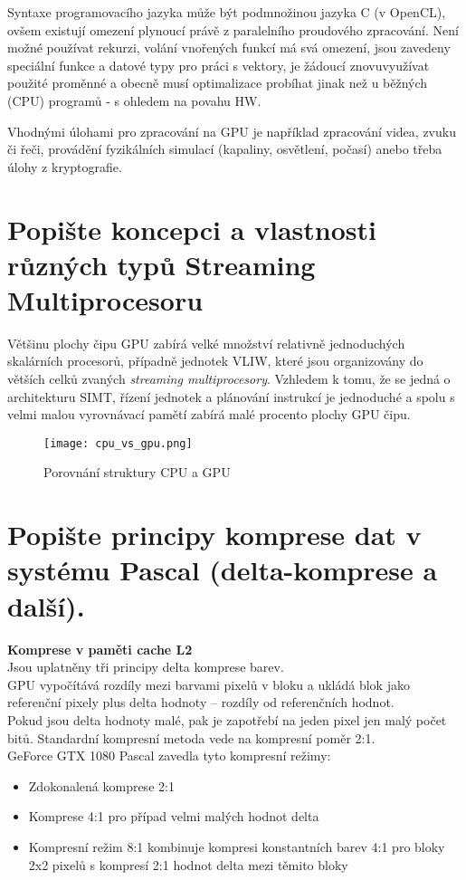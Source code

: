 	Syntaxe programovacího jazyka může být podmnožinou jazyka C (v OpenCL), ovšem existují omezení plynoucí právě z paralelního proudového zpracování. Není možné používat rekurzi, volání vnořených funkcí má svá omezení, jsou zavedeny speciální funkce a datové typy pro práci s vektory, je žádoucí znovuvyužívat použité proměnné a obecně musí optimalizace probíhat jinak než u běžných (CPU) programů - s ohledem na povahu HW.
	
	Vhodnými úlohami pro zpracování na GPU je například zpracování videa, zvuku či řeči, provádění fyzikálních simulací (kapaliny, osvětlení, počasí) anebo třeba úlohy z kryptografie.


\section{Popište koncepci a vlastnosti různých typů Streaming Multiprocesoru}
	\label{sec:streaming_multiprocesor}
	Většinu plochy čipu GPU zabírá velké množství relativně jednoduchých skalárních procesorů, případně jednotek VLIW, které jsou organizovány do větších celků zvaných \emph{streaming multiprocesory}.
	Vzhledem k tomu, že se jedná o architekturu SIMT, řízení jednotek a plánování instrukcí je jednoduché a spolu s velmi malou vyrovnávací pamětí zabírá malé procento plochy GPU čipu.
	\begin{figure}[h!]
		\centering
		\texttt{[image: cpu\_vs\_gpu.png]}
		\caption{Porovnání struktury CPU a GPU}
		\label{fig:cpu_vs_gpu}
	\end{figure}
	
	
\section{Popište principy komprese dat v systému Pascal (delta-komprese a další).}
	\label{sec:komprese}
	\textbf{Komprese v paměti cache L2} \\
	Jsou uplatněny tři principy delta komprese barev. \\
	GPU vypočítává rozdíly mezi barvami pixelů v bloku a ukládá blok jako referenční pixely plus delta hodnoty -- rozdíly od referenčních hodnot. \\
	Pokud jsou delta hodnoty malé, pak je zapotřebí na jeden pixel jen malý	počet bitů. Standardní kompresní metoda vede na kompresní poměr 2:1. \\
	GeForce GTX 1080 Pascal zavedla tyto kompresní režimy:
	\begin{itemize}
		\setlength\itemsep{0em}
		\item Zdokonalená komprese 2:1
		\item Komprese 4:1 pro případ velmi malých hodnot delta
		\item Kompresní režim 8:1 kombinuje kompresi konstantních barev 4:1 pro bloky 2x2 pixelů s kompresí 2:1 hodnot delta mezi těmito bloky
	\end{itemize}	
	
